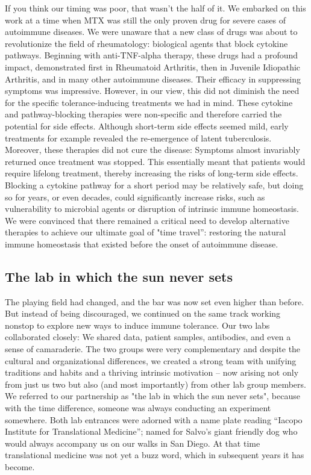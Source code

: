 \documentclass[authordate, editorial, issue]{jote-new-article}
\begin{document}
	If you think our timing was poor, that wasn't the half of it. We embarked on this work at a time when MTX was still the only proven drug for severe cases of autoimmune diseases. We were unaware that a new class of drugs was about to revolutionize the field of rheumatology: biological agents that block cytokine pathways. Beginning with anti-TNF-alpha therapy, these drugs had a profound impact, demonstrated first in Rheumatoid Arthritis, then in Juvenile Idiopathic Arthritis, and in many other autoimmune diseases. Their efficacy in suppressing symptoms was impressive. However, in our view, this did not diminish the need for the specific tolerance-inducing treatments we had in mind. These cytokine and pathway-blocking therapies were non-specific and therefore carried the potential for side effects. Although short-term side effects seemed mild, early treatments for example revealed the re-emergence of latent tuberculosis. Moreover, these therapies did not cure the disease: Symptoms almost invariably returned once treatment was stopped. This essentially meant that patients would require lifelong treatment, thereby increasing the risks of long-term side effects. Blocking a cytokine pathway for a short period may be relatively safe, but doing so for years, or even decades, could significantly increase risks, such as vulnerability to microbial agents or disruption of intrinsic immune homeostasis. We were convinced that there remained a critical need to develop alternative therapies to achieve our ultimate goal of "time travel”: restoring the natural immune homeostasis that existed before the onset of autoimmune disease.







	\subsection{The lab in which the sun never sets}



	The playing field had changed, and the bar was now set even higher than before. But instead of being discouraged, we continued on the same track working nonstop to explore new ways to induce immune tolerance. Our two labs collaborated closely: We shared data, patient samples, antibodies, and even a sense of camaraderie. The two groups were very complementary and despite the cultural and organizational differences, we created a strong team with unifying traditions and habits and a thriving intrinsic motivation -- now arising not only from just us two but also (and most importantly) from other lab group members. We referred to our partnership as "the lab in which the sun never sets", because with the time difference, someone was always conducting an experiment somewhere. Both lab entrances were adorned with a name plate reading “Iacopo Institute for Translational Medicine”; named for Salvo's giant friendly dog who would always accompany us on our walks in San Diego. At that time translational medicine was not yet a buzz word, which in subsequent years it has become.
\end{document}
